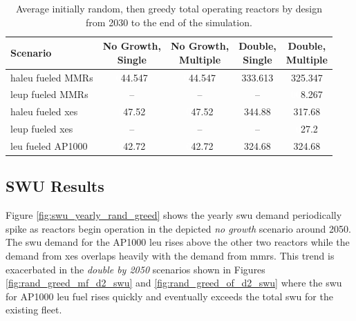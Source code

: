 \begin{table}[H]
    \centering
    \caption{Average initially random, then greedy total operating reactors by design from 2030 to the end of the simulation.}
    \label{tab:rand_greed_reac_avg}
    \begin{tabular}{l c c c c}
       \toprule
       Scenario & \shortstack{No Growth,\\ Single} & \shortstack{No Growth,\\ Multiple} & \shortstack{Double,\\ Single} & \shortstack{Double,\\ Multiple}  \\
       \midrule
       \gls{haleu} fueled MMRs      & \textcolor{white}{0}44.547  & \textcolor{white}{0}44.547  & 333.613 & 325.347 \\
       \gls{leup} fueled MMRs       & --      & --      & --      & \textcolor{white}{00}8.267   \\
       \gls{haleu} fueled \gls{xe}s & \textcolor{white}{0}47.52   & \textcolor{white}{0}47.52   & 344.88  & 317.68  \\
       \gls{leup} fueled \gls{xe}s  & --      & --      & --      & \textcolor{white}{0}27.2    \\
       \gls{leu} fueled AP1000      & \textcolor{white}{0}42.72   & \textcolor{white}{0}42.72   & 324.68  & 324.68  \\
       \bottomrule
    \end{tabular}
\end{table}

\subsection{SWU Results}
\label{sec:rand_greed_swu}

Figure \ref{fig:swu_yearly_rand_greed} shows the yearly \gls{swu} demand periodically spike as reactors begin operation in the depicted \textit{no growth} scenario around 2050. The \gls{swu} demand for the AP1000 \gls{leu} rises above the other two reactors while the demand from \glspl{xe} overlaps heavily with the demand from \glspl{mmr}. This trend is exacerbated in the \textit{double by 2050} scenarios shown in Figures \ref{fig:rand_greed_mf_d2_swu} and \ref{fig:rand_greed_of_d2_swu} where the \gls{swu} for AP1000 \gls{leu} fuel rises quickly and eventually exceeds the total \gls{swu} for the existing fleet.

